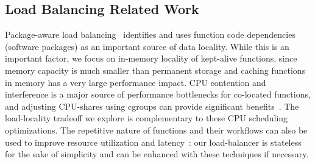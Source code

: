 \subsection{Load Balancing Related Work}

\begin{comment}
\noindent \textbf{FaaS Resource Management.}
The initialization overheads of serverless functions and their repeated invocations have spawned a great deal of research into optimizing their resource management.
Recent surveys~\cite{faas-survey-jan-2022, raza2021sok, eismann2020serverless, hassan2021survey, mampage2021holistic} provide an overview of the challenges and solutions in this very active research area. 

Reducing the overhead of serverless functions through various systems and virtualization-level mechanisms and  optimizations~\cite{du2020catalyzer, firecracker-nsdi20, dukic2020photons, akkus_sand_2018, vhive-asplos21, carreira2021warm}. 
%
Locality for FaaS resource management has been explored in the form of function keep-alive policies~\cite{shahrad_serverless_2020}. 
Our work builds on and uses the caching-based Greedy-Dual policy from FaasCache~\cite{faascache-asplos21}. 
%
Single-server environments have been the focus of these mechanisms and policies: we have made an initial attempt to understand their interactions in a distributed cluster context.
%
Inter-function dependencies can also be used for predictive resource management and reducing function communication and startup costs~\cite{gunasekaran2020fifer, daw2021speedo, shen2021defuse}: incorporating these policies into our load-balancer is part of future work. 
\end{comment}

Package-aware load balancing~\cite{package-cristina-19}  identifies and uses function code dependencies (software packages) as an important source of data locality.
While this is an important factor, we focus on in-memory locality of kept-alive functions, since memory capacity is much smaller than permanent storage and caching functions in memory has a very large performance impact.
%
CPU contention and interference is a major source of performance bottlenecks for co-located functions, and adjusting CPU-shares using cgroups can provide significant benefits~\cite{suresh2019fnsched, suresh2021servermore, ensure-faas-acsos20}.
%
The load-locality tradeoff we explore is complementary to these CPU scheduling optimizations. 
%
The repetitive nature of functions and their workflows can also be used to improve resource utilization and latency~\cite{hunhoff2020proactive, yu2021faasrank, puru_xanadu_20, przybylski2021data}: our load-balancer is stateless for the sake of simplicity and can be enhanced with these techniques if necessary.


